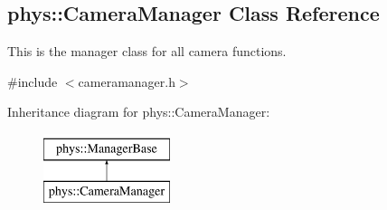 \hypertarget{classphys_1_1CameraManager}{
\subsection{phys::CameraManager Class Reference}
\label{classphys_1_1CameraManager}
}


This is the manager class for all camera functions.  




{\ttfamily \#include $<$cameramanager.h$>$}

Inheritance diagram for phys::CameraManager:\begin{figure}[H]
\begin{center}
\leavevmode
\includegraphics[height=2.000000cm]{classphys_1_1CameraManager}
\end{center}
\end{figure}
